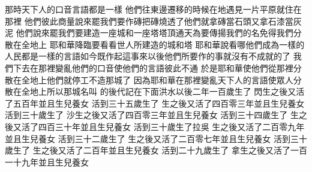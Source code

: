 \bchapter%
那時\chientien 天下人的口音言語\chientien 都是一樣\chuan 
{}他們往東邊遷移的時候\chientien 在地遇見一片平原\chientien 就住在那裡\chuan 
{}他們彼此商量說\chientien 來罷\chientien 我們要作磚\chientien 把磚燒透了\chuan 他們就拿磚當石頭\chientien 又拿石漆當灰泥\chuan 
{}他們說\chientien 來罷\chientien 我們要建造一座城\chientien 和一座塔\chientien 塔頂通天\chientien 為要傳揚我們的名\chientien 免得我們分散在全地上\chuan 
{}耶和華降臨要看看世人所建造的城和塔\chuan 
{}耶和華說\chientien 看哪\chientien 他們成為一樣的人民\chientien 都是一樣的言語\chientien 如今既作起這事來\chientien 以後他們所要作的事\chientien 就沒有不成就的了\chuan 
{}我們下去\chientien 在那裡變亂他們的口音\chientien 使他們的言語\chientien 彼此不通\chuan 
{}於是耶和華使他們從那裡分散在全地上\yuentien 他們就停工\chientien 不造那城了\chuan 
{}因為耶和華在那裡變亂天下人的言語\chientien 使眾人分散在全地上\chientien 所以那城名叫\chuan{}\Chuan
{}的後代記在下面\yuentien 洪水以後二年\chientien {}一百歲生了\chuan 
{}閃生之後\chientien 又活了五百年\yuentien 並且生兒養女\chuan 
{}活到三十五歲\chientien 生了\yuentien 
{}生之後\chientien 又活了四百零三年\yuentien 並且生兒養女\chuan 
{}活到三十歲\chientien 生了\yuentien 
{}沙生之後\chientien 又活了四百零三年\yuentien 並且生兒養女\chuan 
{}活到三十四歲\chientien 生了\yuentien 
{}生之後\chientien 又活了四百三十年\yuentien 並且生兒養女\chuan 
{}活到三十歲\chientien 生了拉吳\yuentien 
{}生之後\chientien 又活了二百零九年\yuentien 並且生兒養女\chuan 
{}活到三十二歲\chientien 生了\yuentien 
{}生之後\chientien 又活了二百零七年\yuentien 並且生兒養女\chuan 
{}活到三十歲\chientien 生了\yuentien 
{}生之後\chientien 又活了二百年\yuentien 並且生兒養女\chuan 
{}活到二十九歲\chientien 生了\yuentien 
{}拿生之後\chientien 又活了一百一十九年\yuentien 並且生兒養女\chuan 
